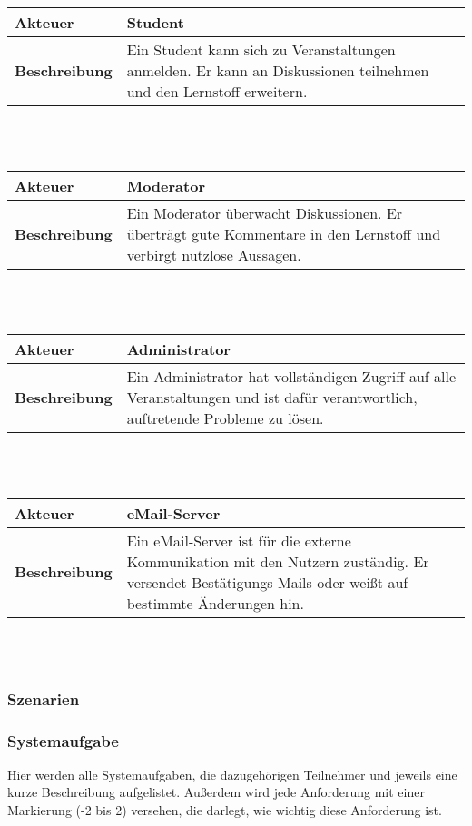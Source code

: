 \documentclass[12pt,a4paper]{article}
\begin{document}
\begin{tabular}{l p{10cm}}
\textbf{Akteuer} & Student \\ 
\hline \textbf{Beschreibung} & Ein Student kann sich zu Veranstaltungen anmelden. Er kann an Diskussionen teilnehmen und den Lernstoff erweitern.\\ 
\hline 
\end{tabular}\\\\

\begin{tabular}{l p{10cm}}
\textbf{Akteuer} & Moderator \\ 
\hline \textbf{Beschreibung} & Ein Moderator überwacht Diskussionen. Er überträgt gute Kommentare in den Lernstoff und verbirgt nutzlose Aussagen.\\ 
\hline 
\end{tabular}\\\\

\begin{tabular}{l p{10cm}}
\textbf{Akteuer} & Administrator \\ 
\hline \textbf{Beschreibung} & Ein Administrator hat vollständigen Zugriff auf alle Veranstaltungen und ist dafür verantwortlich, auftretende Probleme zu lösen. \\ 
\hline 
\end{tabular}\\\\

\begin{tabular}{l p{10cm}}
\textbf{Akteuer} & eMail-Server \\ 
\hline \textbf{Beschreibung} & Ein eMail-Server ist für die externe Kommunikation mit den Nutzern zuständig. Er versendet Bestätigungs-Mails oder weißt auf bestimmte Änderungen hin. \\ 
\hline 
\end{tabular}\\\\

\subsubsection{Szenarien}
\subsubsection{Systemaufgabe}
Hier werden alle Systemaufgaben, die dazugehörigen Teilnehmer und jeweils eine kurze Beschreibung aufgelistet. Außerdem wird jede Anforderung mit einer Markierung (-2 bis 2) versehen, die darlegt, wie wichtig diese Anforderung ist.
\newpage
\end{document}
